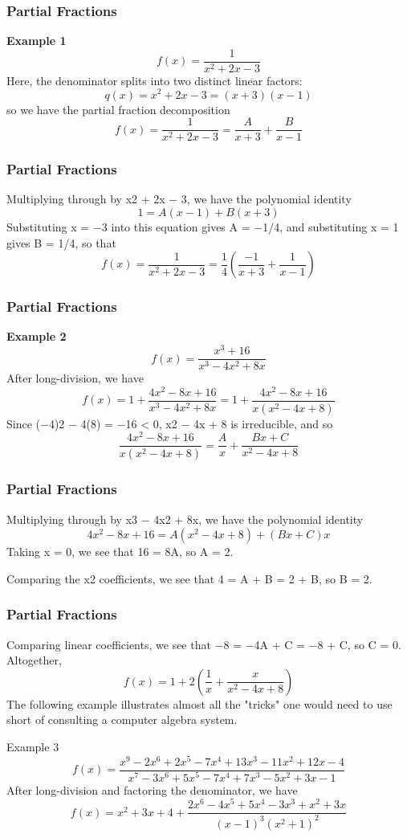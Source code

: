 \documentclass{beamer}
\begin{document}
\begin{frame}
\frametitle{Partial Fractions}

\textbf{Example 1}
\[ f(x)=\frac{1}{x^2+2x-3} \]
Here, the denominator splits into two distinct linear factors:
\[q(x)=x^2+2x-3=(x+3)(x-1)\]
so we have the partial fraction decomposition
\[f(x)=\frac{1}{x^2+2x-3} =\frac{A}{x+3}+\frac{B}{x-1}\]
\end{frame}
\begin{frame}
\frametitle{Partial Fractions}
Multiplying through by x2 + 2x − 3, we have the polynomial identity
\[ 1=A(x-1)+B(x+3) \]
Substituting x = −3 into this equation gives A = −1/4, and substituting x = 1 gives B = 1/4, so that
\[f(x) =\frac{1}{x^2+2x-3} =\frac{1}{4}\left(\frac{-1}{x+3}+\frac{1}{x-1}\right) \]
\end{frame}
\begin{frame}
\frametitle{Partial Fractions}

\textbf{Example 2}
\[f(x)=\frac{x^3+16}{x^3-4x^2+8x}\]
After long-division, we have
\[ f(x)=1+\frac{4x^2-8x+16}{x^3-4x^2+8x}=1+\frac{4x^2-8x+16}{x(x^2-4x+8)} \]
Since (−4)2 − 4(8) = −16 < 0, x2 − 4x + 8 is irreducible, and so
\[ \frac{4x^2-8x+16}{x(x^2-4x+8)}=\frac{A}{x}+\frac{Bx+C}{x^2-4x+8} \]
\end{frame}
\begin{frame}
\frametitle{Partial Fractions}
Multiplying through by x3 − 4x2 + 8x, we have the polynomial identity
\[ 4x^2-8x+16 = A(x^2-4x+8)+(Bx+C)x \]
Taking x = 0, we see that 16 = 8A, so A = 2. 

Comparing the x2 coefficients, we see that 4 = A + B = 2 + B, so B = 2. 
\end{frame}
\begin{frame}
\frametitle{Partial Fractions}
Comparing linear coefficients, we see that −8 = −4A + C = −8 + C, so C = 0. Altogether,
\[ f(x)=1+2\left(\frac{1}{x}+\frac{x}{x^2-4x+8}\right)  \]
The following example illustrates almost all the "tricks" one would need to use short of consulting a computer algebra system.
\end{frame}
\begin{frame}
Example 3
\[f(x)=\frac{x^9-2x^6+2x^5-7x^4+13x^3-11x^2+12x-4}{x^7-3x^6+5x^5-7x^4+7x^3-5x^2+3x-1}\]
After long-division and factoring the denominator, we have
\[ f(x)=x^2+3x+4+\frac{2x^6-4x^5+5x^4-3x^3+x^2+3x}{(x-1)^3(x^2+1)^2} \]

\end{frame}
\end{document}

